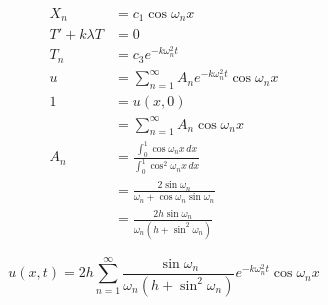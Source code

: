 \documentclass{article}
\begin{document}
\begin{align*}
  X_n                     & = c_1 \cos \omega_n x                                                     \\
  T' + k \lambda T        & = 0                                                                       \\
  T_n                     & = c_3 e^{-k \omega_n^2 t}                                                 \\
  u                       & = \sum_{n = 1}^\infty A_n e^{-k \omega_n^2 t} \cos \omega_n x             \\
  1                       & = u(x, 0)                                                                 \\
                          & = \sum_{n = 1}^\infty A_n \cos \omega_n x                                 \\
  A_n                     & = \frac{\int_0^1 \cos \omega_n x \,d x}{\int_0^1 \cos^2 \omega_n x \,d x} \\
                          & = \frac{2 \sin \omega_n}{\omega_n + \cos \omega_n \sin \omega_n}          \\
                          & = \frac{2 h \sin \omega_n}{\omega_n (h + \sin^2 \omega_n)}
\end{align*}

\[u(x, t) = 2 h \sum_{n = 1}^\infty \frac{\sin \omega_n}{\omega_n (h + \sin^2 \omega_n)} e^{-k \omega_n^2 t} \cos \omega_n x\]

\setcounter{subsubsection}{2}
\subsubsection{}
\end{document}
